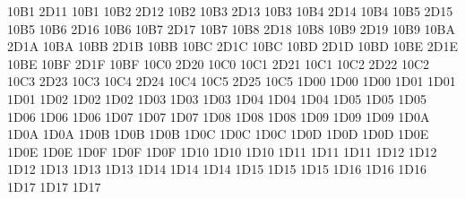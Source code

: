 \setcclcucx 10B1 2D11 10B1 %
\setcclcucx 10B2 2D12 10B2 %
\setcclcucx 10B3 2D13 10B3 %
\setcclcucx 10B4 2D14 10B4 %
\setcclcucx 10B5 2D15 10B5 %
\setcclcucx 10B6 2D16 10B6 %
\setcclcucx 10B7 2D17 10B7 %
\setcclcucx 10B8 2D18 10B8 %
\setcclcucx 10B9 2D19 10B9 %
\setcclcucx 10BA 2D1A 10BA %
\setcclcucx 10BB 2D1B 10BB %
\setcclcucx 10BC 2D1C 10BC %
\setcclcucx 10BD 2D1D 10BD %
\setcclcucx 10BE 2D1E 10BE %
\setcclcucx 10BF 2D1F 10BF %
\setcclcucx 10C0 2D20 10C0 %
\setcclcucx 10C1 2D21 10C1 %
\setcclcucx 10C2 2D22 10C2 %
\setcclcucx 10C3 2D23 10C3 %
\setcclcucx 10C4 2D24 10C4 %
\setcclcucx 10C5 2D25 10C5 %
\setcclcucx 1D00 1D00 1D00 %
\setcclcucx 1D01 1D01 1D01 %
\setcclcucx 1D02 1D02 1D02 %
\setcclcucx 1D03 1D03 1D03 %
\setcclcucx 1D04 1D04 1D04 %
\setcclcucx 1D05 1D05 1D05 %
\setcclcucx 1D06 1D06 1D06 %
\setcclcucx 1D07 1D07 1D07 %
\setcclcucx 1D08 1D08 1D08 %
\setcclcucx 1D09 1D09 1D09 %
\setcclcucx 1D0A 1D0A 1D0A %
\setcclcucx 1D0B 1D0B 1D0B %
\setcclcucx 1D0C 1D0C 1D0C %
\setcclcucx 1D0D 1D0D 1D0D %
\setcclcucx 1D0E 1D0E 1D0E %
\setcclcucx 1D0F 1D0F 1D0F %
\setcclcucx 1D10 1D10 1D10 %
\setcclcucx 1D11 1D11 1D11 %
\setcclcucx 1D12 1D12 1D12 %
\setcclcucx 1D13 1D13 1D13 %
\setcclcucx 1D14 1D14 1D14 %
\setcclcucx 1D15 1D15 1D15 %
\setcclcucx 1D16 1D16 1D16 %
\setcclcucx 1D17 1D17 1D17 %
